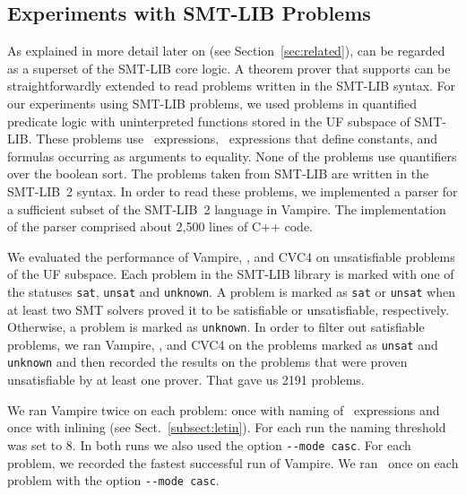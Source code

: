\subsection{Experiments with SMT-LIB Problems}\label{subsec:SMT}
As explained in more detail later on (see Section~\ref{sec:related}), \folb{} can be regarded as a superset of the SMT-LIB core logic.
A theorem prover that supports \folb{} can be straightforwardly extended to read problems written in the SMT-LIB syntax.
%
For our experiments using SMT-LIB problems, we used problems in quantified predicate logic with uninterpreted functions stored in the UF subspace of SMT-LIB.
These problems use \ITE\ expressions, \LETIN\ expressions that define constants, and formulas 
occurring as arguments to equality. None of the problems use quantifiers over the boolean sort. 
 The  problems taken from SMT-LIB are written in the SMT-LIB~2
 syntax. In order to read these problems, we implemented a parser for
 a sufficient subset of the SMT-LIB~2 language in Vampire. The
 implementation of the parser comprised about 2,500 lines of C++ code. 

We evaluated the performance of Vampire, \oldcnfVampire, and CVC4 on unsatisfiable problems of the UF subspace. Each problem in the SMT-LIB library is marked with one of the statuses \verb'sat', \verb'unsat' and \verb'unknown'. A problem is marked as \verb'sat' or \verb'unsat' 
when at least two SMT solvers proved it to be satisfiable or unsatisfiable, respectively.
Otherwise, a problem is marked as \verb'unknown'. In order to filter out satisfiable problems,
we ran Vampire, \oldcnfVampire, and CVC4 on the problems marked as \verb'unsat' and \verb'unknown' and then recorded the results on the problems that were proven unsatisfiable by at least one prover. That gave us 2191 problems.

We ran Vampire twice on each problem: once with naming of \LETIN\ expressions and once with inlining (see Sect.~\ref{subsect:letin}).
For each run the naming threshold was set to 8. In both runs we also used the option \verb'--mode casc'. For each problem, we recorded the fastest successful run of Vampire. We ran \oldcnfVampire\ once on each problem with the option \verb'--mode casc'.

